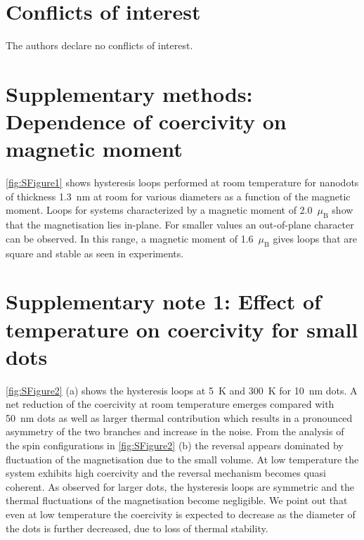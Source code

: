 \documentclass[aps,prb,signlecolumn,preprint,superscriptaddress,10]{revtex4-1}
\newcommand{\muB}{\ensuremath{\mu_{\mathrm{B}}}\xspace}
\begin{document}
\section*{Conflicts of interest}
The authors declare no conflicts of interest.
%
 \pagebreak
 \newpage
\setcounter{equation}{0}
\setcounter{figure}{0}
 \renewcommand{\theequation}{Supplementari Eq. \arabic{equation}}
 \renewcommand{\thefigure}{Supplemntary Fig. \arabic{figure}}
%
\section*{Supplementary methods: Dependence of coercivity on magnetic moment}
\ref{fig:SFigure1} shows hysteresis loops performed at room temperature for nanodots of thickness 1.3~nm at room for various diameters as a function of the magnetic moment. Loops for systems characterized by a magnetic moment of 2.0~\muB show that the magnetisation lies in-plane. For smaller values an out-of-plane character can be observed. In this range, a magnetic moment of 1.6~\muB gives loops that are square and stable as seen in experiments.
\section*{Supplementary note 1: Effect of temperature on coercivity for small dots}
\ref{fig:SFigure2} (a) shows the hysteresis loops at 5~K and 300~K for 10~nm dots. A net reduction of the coercivity at room temperature emerges compared with 50~nm dots as well as larger thermal contribution which results in a pronounced asymmetry of the two branches and increase in the noise. From the analysis of the spin configurations in \ref{fig:SFigure2} (b) the reversal appears dominated by fluctuation of the magnetisation due to the small volume. At low temperature the system exhibits high coercivity and the reversal mechanism becomes quasi coherent. As observed for larger dots, the hysteresis loops are symmetric and the thermal fluctuations of the magnetisation become negligible. We point out that even at low temperature the coercivity is expected to decrease as the diameter of the dots is further decreased, due to loss of thermal stability.
\end{document}
